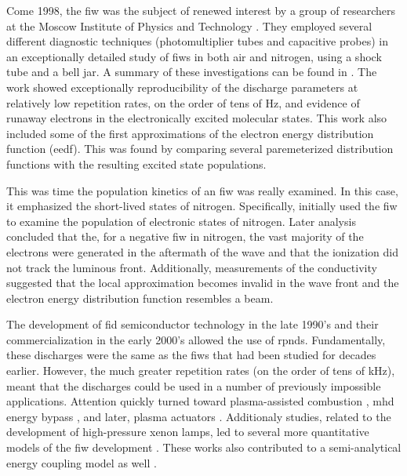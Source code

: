Come 1998, the fiw was the subject of renewed interest by a group of researchers
at the Moscow Institute of Physics and Technology \cite{Anikin1998}. They
employed several different diagnostic techniques (photomultiplier tubes and
capacitive probes) in an exceptionally detailed study of fiws in both air and
nitrogen, using a shock tube and a bell jar. A summary of these investigations
can be found in \cite{Starikovskaia2001}. The work showed exceptionally
reproducibility of the discharge parameters at relatively low repetition rates,
on the order of tens of Hz, and evidence of runaway electrons in the
electronically excited molecular states. This work also included some of the
first approximations of the electron energy distribution function (\acs{eedf}).
This was found by comparing several paremeterized distribution functions with
the resulting excited state populations. 

This was time the population kinetics of an fiw was really examined. In this
case, it emphasized the short-lived states of nitrogen. Specifically,
\cite{Pancheshnyi1998} initially used the fiw to examine the population of
electronic states of nitrogen. Later analysis \cite{Pancheshnyi1999} concluded
that the, for a negative fiw in nitrogen, the vast majority of the electrons
were generated in the aftermath of the wave and that the ionization did not
track the luminous front. Additionally, measurements of the conductivity
suggested that the local approximation becomes invalid in the wave front and the
electron energy distribution function resembles a beam.

The development of fid semiconductor technology in the late 1990's and their
commercialization in the early 2000's allowed the use of rpnds. Fundamentally,
these discharges were the same as the fiws that had been studied for decades
earlier. However, the much greater repetition rates (on the order of tens of
kHz), meant that the discharges could be used in a number of previously
impossible applications. Attention quickly turned toward plasma-assisted
combustion \cite{Starikovskaia2006}, mhd energy bypass \cite{Macheret2002}, and
later, plasma actuators \cite{Adamovich2009}. Additionaly studies, related to
the development of high-pressure xenon lamps, led to several more quantitative
models of the fiw development \cite{Nikandrov2008, Tsendin2009}. These works
also contributed to a semi-analytical energy coupling model as well
\cite{Adamovich2009}.

